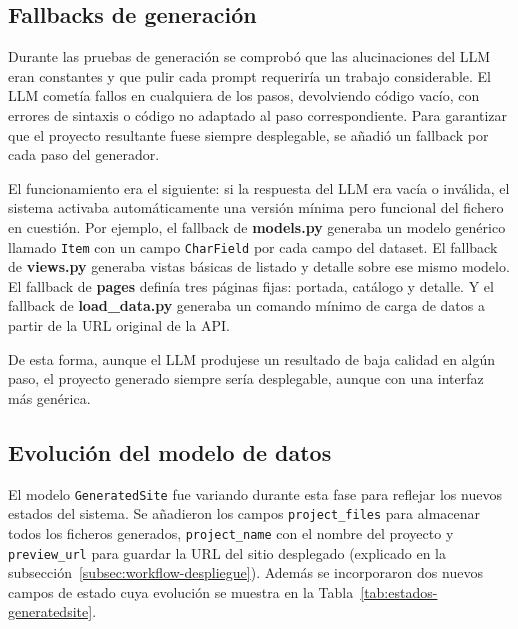 \subsection{Fallbacks de generación}
\label{subsec:fallbacks-generacion}

Durante las pruebas de generación se comprobó que las alucinaciones del LLM 
eran constantes y que pulir cada prompt requeriría un trabajo considerable. 
El LLM cometía fallos en cualquiera de los pasos, devolviendo código vacío, 
con errores de sintaxis o código no adaptado al paso correspondiente. Para 
garantizar que el proyecto resultante fuese siempre desplegable, se añadió 
un fallback por cada paso del generador.

El funcionamiento era el siguiente: si la respuesta del LLM era vacía o 
inválida, el sistema activaba automáticamente una versión mínima pero 
funcional del fichero en cuestión. Por ejemplo, el fallback de 
\textbf{models.py} generaba un modelo genérico llamado \texttt{Item} con 
un campo \texttt{CharField} por cada campo del dataset. El fallback de 
\textbf{views.py} generaba vistas básicas de listado y detalle sobre ese 
mismo modelo. El fallback de \textbf{pages} definía tres páginas fijas: 
portada, catálogo y detalle. Y el fallback de \textbf{load\_data.py} 
generaba un comando mínimo de carga de datos a partir de la URL original 
de la API.

De esta forma, aunque el LLM produjese un resultado de baja calidad en 
algún paso, el proyecto generado siempre sería desplegable, aunque con 
una interfaz más genérica.

\subsection{Evolución del modelo de datos}
\label{subsec:modelo-generatedsite}

El modelo \texttt{GeneratedSite} fue variando durante esta fase para reflejar 
los nuevos estados del sistema. Se añadieron los campos \texttt{project\_files} 
para almacenar todos los ficheros generados, \texttt{project\_name} con el nombre 
del proyecto y \texttt{preview\_url} para guardar la URL del sitio desplegado 
(explicado en la subsección~\ref{subsec:workflow-despliegue}). Además se 
incorporaron dos nuevos campos de estado cuya evolución se muestra en la 
Tabla~\ref{tab:estados-generatedsite}.


